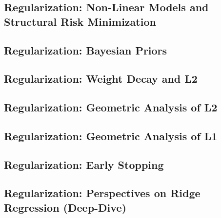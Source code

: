 \documentclass[13pt,compress]{beamer}
\begin{document}

\subsection{Regularization: Non-Linear Models and Structural Risk Minimization}


\subsection{Regularization: Bayesian Priors}


\subsection{Regularization: Weight Decay and L2}


\subsection{Regularization: Geometric Analysis of L2}


\subsection{Regularization: Geometric Analysis of L1}


\subsection{Regularization: Early Stopping}


\subsection{Regularization: Perspectives on Ridge Regression (Deep-Dive)}

\end{document}
